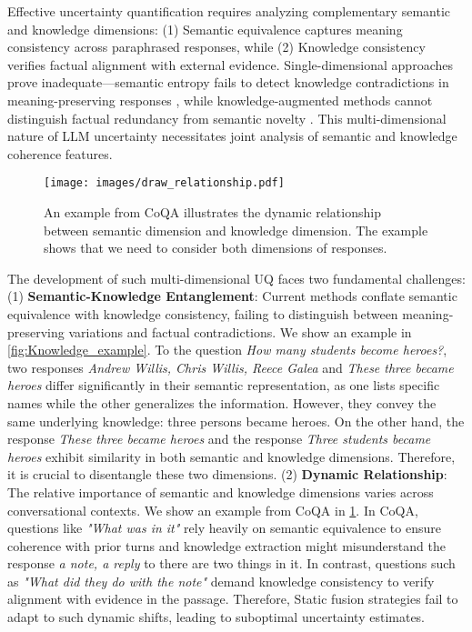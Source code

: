 Effective uncertainty quantification requires analyzing complementary semantic and knowledge dimensions: (1) Semantic equivalence captures meaning consistency across paraphrased responses, while (2) Knowledge consistency verifies factual alignment with external evidence. Single-dimensional approaches prove inadequate—semantic entropy fails to detect knowledge contradictions in meaning-preserving responses \citep{da2024llm}, while knowledge-augmented methods cannot distinguish factual redundancy from semantic novelty \citep{hu2024decomposition}. This multi-dimensional nature of LLM uncertainty necessitates joint analysis of semantic and knowledge coherence features.
\begin{figure}[h]
    \centering
    \texttt{[image: images/draw\_relationship.pdf]}
    \caption{An example from CoQA illustrates the dynamic relationship between semantic dimension and knowledge dimension. The example shows that we need to consider both dimensions of responses.}
    \vspace{-7mm}
    \label{fig:dynamic_example}
\end{figure}
The development of such multi-dimensional UQ faces two fundamental challenges:
(1) \textbf{Semantic-Knowledge Entanglement}: Current methods conflate semantic equivalence with knowledge consistency, failing to distinguish between meaning-preserving variations and factual contradictions. We show an example in \cref{fig:Knowledge_example}. To the question \textit{How many students become heroes?}, two responses \textit{Andrew Willis, Chris Willis, Reece
Galea} and \textit{These three became heroes} differ significantly in their semantic representation, as one lists specific names while the other generalizes the information. However, they convey the same underlying knowledge: three persons became heroes.  On the other hand, the response \textit{These three became heroes} and the response \textit{Three students became heroes} exhibit similarity in both semantic and knowledge dimensions. Therefore, it is crucial to disentangle these two dimensions.
(2) \textbf{Dynamic Relationship}: The relative importance of semantic and knowledge dimensions varies across conversational contexts.  We show an example from CoQA in \cref{fig:dynamic_example}. In CoQA, questions like \textit{"What was in it"} rely heavily on semantic equivalence to ensure coherence with prior turns and knowledge extraction might misunderstand the response \textit{a note, a reply} to there are two things in it. In contrast, questions such as \textit{"What did they do with the note"} demand knowledge consistency to verify alignment with evidence in the passage. Therefore, Static fusion strategies fail to adapt to such dynamic shifts, leading to suboptimal uncertainty estimates.



